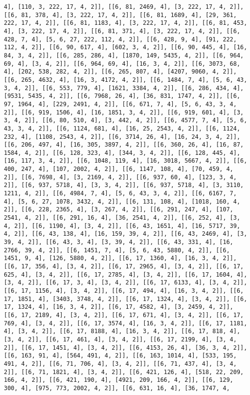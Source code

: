 \documentclass[12pt,fleqn]{article}\usepackage{../../common}
\begin{document}
\begin{verbatim}
4], [110, 3, 222, 17, 4, 2]], [[6, 81, 2469, 4], [3, 222, 17, 4, 2]], [[6, 81, 378, 4], [3, 222, 17, 4, 2]], [[6, 81, 1689, 4], [29, 361, 222, 17, 4, 2]], [[6, 81, 1183, 4], [3, 222, 17, 4, 2]], [[6, 81, 453, 4], [3, 222, 17, 4, 2]], [[6, 81, 371, 4], [3, 222, 17, 4, 2]], [[6, 428, 7, 4], [5, 6, 27, 222, 112, 4, 2]], [[6, 428, 9, 4], [91, 222, 112, 4, 2]], [[6, 90, 617, 4], [602, 3, 4, 2]], [[6, 90, 445, 4], [16, 84, 3, 4, 2]], [[6, 285, 286, 4], [1870, 149, 5435, 4, 2]], [[6, 964, 69, 4], [3, 4, 2]], [[6, 964, 69, 4], [16, 3, 4, 2]], [[6, 3073, 68, 4], [202, 538, 282, 4, 2]], [[6, 265, 807, 4], [4207, 9060, 4, 2]], [[6, 265, 4632, 4], [16, 3, 4172, 4, 2]], [[6, 1484, 7, 4], [5, 6, 43, 3, 4, 2]], [[6, 553, 779, 4], [1621, 3384, 4, 2]], [[6, 286, 434, 4], [9531, 5435, 4, 2]], [[6, 7968, 26, 4], [36, 831, 1747, 4, 2]], [[6, 97, 1964, 4], [229, 2491, 4, 2]], [[6, 671, 7, 4], [5, 6, 43, 3, 4, 2]], [[6, 919, 1506, 4], [16, 1851, 3, 4, 2]], [[6, 919, 601, 4], [3, 3, 4, 2]], [[6, 80, 510, 4], [3, 442, 4, 2]], [[6, 4577, 7, 4], [5, 6, 43, 3, 4, 2]], [[6, 1124, 681, 4], [16, 25, 2543, 4, 2]], [[6, 1124, 232, 4], [1108, 2543, 4, 2]], [[6, 3714, 26, 4], [16, 24, 3, 4, 2]], [[6, 206, 497, 4], [16, 305, 3897, 4, 2]], [[6, 360, 26, 4], [16, 87, 1584, 4, 2]], [[6, 128, 323, 4], [344, 3, 4, 2]], [[6, 128, 445, 4], [16, 117, 3, 4, 2]], [[6, 1048, 119, 4], [16, 3018, 5667, 4, 2]], [[6, 400, 247, 4], [107, 2002, 4, 2]], [[6, 1147, 108, 4], [70, 459, 4, 2]], [[6, 7698, 4], [3, 2169, 4, 2]], [[6, 937, 60, 4], [123, 3, 4, 2]], [[6, 937, 5718, 4], [3, 3, 4, 2]], [[6, 937, 5718, 4], [3, 3110, 1211, 4, 2]], [[6, 4984, 7, 4], [5, 6, 43, 3, 4, 2]], [[6, 6167, 7, 4], [5, 6, 27, 1078, 3432, 4, 2]], [[6, 131, 108, 4], [1018, 160, 4, 2]], [[6, 228, 2365, 4], [3, 267, 4, 2]], [[6, 291, 247, 4], [107, 2541, 4, 2]], [[6, 291, 16, 4], [36, 2541, 4, 2]], [[6, 252, 4], [3, 4, 2]], [[6, 1190, 4], [3, 4, 2]], [[6, 43, 1651, 4], [16, 5717, 39, 4, 2]], [[6, 43, 138, 4], [16, 159, 39, 4, 2]], [[6, 43, 2469, 4], [3, 39, 4, 2]], [[6, 43, 3, 4], [3, 39, 4, 2]], [[6, 43, 331, 4], [16, 2766, 39, 4, 2]], [[6, 1451, 7, 4], [5, 6, 43, 5880, 4, 2]], [[6, 1451, 9, 4], [126, 5880, 4, 2]], [[6, 17, 1360, 4], [16, 3, 4, 2]], [[6, 17, 356, 4], [3, 4, 2]], [[6, 17, 2965, 4], [3, 4, 2]], [[6, 17, 625, 4], [3, 4, 2]], [[6, 17, 2785, 4], [3, 4, 2]], [[6, 17, 1604, 4], [3, 4, 2]], [[6, 17, 3, 4], [3, 4, 2]], [[6, 17, 6133, 4], [3, 4, 2]], [[6, 17, 1156, 4], [3, 4, 2]], [[6, 17, 494, 4], [16, 3, 4, 2]], [[6, 17, 1851, 4], [3403, 3748, 4, 2]], [[6, 17, 1324, 4], [3, 4, 2]], [[6, 17, 1324, 4], [16, 3, 4, 2]], [[6, 17, 4582, 4], [3, 2459, 4, 2]], [[6, 17, 2189, 4], [3, 4, 2]], [[6, 17, 671, 4], [3, 4, 2]], [[6, 17, 769, 4], [3, 4, 2]], [[6, 17, 3574, 4], [16, 3, 4, 2]], [[6, 17, 1181, 4], [3, 4, 2]], [[6, 17, 8188, 4], [16, 3, 4, 2]], [[6, 17, 818, 4], [3, 4, 2]], [[6, 17, 461, 4], [3, 4, 2]], [[6, 17, 2199, 4], [3, 4, 2]], [[6, 17, 1451, 4], [3, 4, 2]], [[6, 4153, 26, 4], [36, 3, 4, 2]], [[6, 163, 91, 4], [564, 491, 4, 2]], [[6, 163, 1014, 4], [533, 195, 491, 4, 2]], [[6, 71, 706, 4], [3, 4, 2]], [[6, 71, 437, 4], [3, 4, 2]], [[6, 71, 1821, 4], [3, 4, 2]], [[6, 421, 126, 4], [518, 22, 209, 166, 4, 2]], [[6, 421, 190, 4], [4921, 209, 166, 4, 2]], [[6, 129, 300, 4], [975, 773, 2002, 4, 2]], [[6, 631, 16, 4], [36, 1747, 4, 
\end{verbatim}
\end{document}
